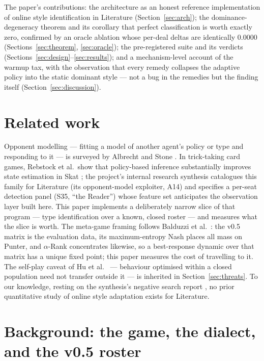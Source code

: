 \documentclass[11pt]{article}
\begin{document}
The paper's contributions: the architecture as an honest reference implementation of
online style identification in Literature (Section~\ref{sec:arch}); the
dominance-degeneracy theorem and its corollary that perfect classification is worth exactly
zero, confirmed by an oracle ablation whose per-deal deltas are identically $0.0000$
(Sections~\ref{sec:theorem}, \ref{sec:oracle}); the pre-registered suite and its verdicts
(Sections~\ref{sec:design}--\ref{sec:results}); and a mechanism-level account of the
warmup tax, with the observation that every remedy collapses the adaptive policy into the
static dominant style --- not a bug in the remedies but the finding itself
(Section~\ref{sec:discussion}).

\section{Related work}
\label{sec:related}

Opponent modelling --- fitting a model of another agent's policy or type and responding to
it --- is surveyed by Albrecht and Stone \cite{albrechtstone2018}. In trick-taking card
games, Rebstock et al.\ show that policy-based inference substantially improves state
estimation in Skat \cite{rebstock2019}; the project's internal research synthesis
\cite{playstyles} catalogues this family for Literature (its opponent-model exploiter,
A14) and specifies a per-seat detection panel (S35, ``the Reader'') whose feature set
anticipates the observation layer built here. This paper implements a deliberately narrow
slice of that program --- type identification over a known, closed roster --- and measures
what the slice is worth. The meta-game framing follows Balduzzi et al.\
\cite{balduzzi2018}: the v0.5 matrix is the evaluation data, its maximum-entropy Nash
places all mass on Punter, and $\alpha$-Rank \cite{omidshafiei2019} concentrates likewise,
so a best-response dynamic over that matrix has a unique fixed point; this paper measures
the cost of travelling to it. The self-play caveat of Hu et al.\ \cite{hu2020} ---
behaviour optimised within a closed population need not transfer outside it --- is
inherited in Section~\ref{sec:threats}. To our knowledge, resting on the synthesis's
negative search report \cite{playstyles,v05paper}, no prior quantitative study of online
style adaptation exists for Literature.

\section{Background: the game, the dialect, and the v0.5 roster}
\label{sec:background}
\end{document}
